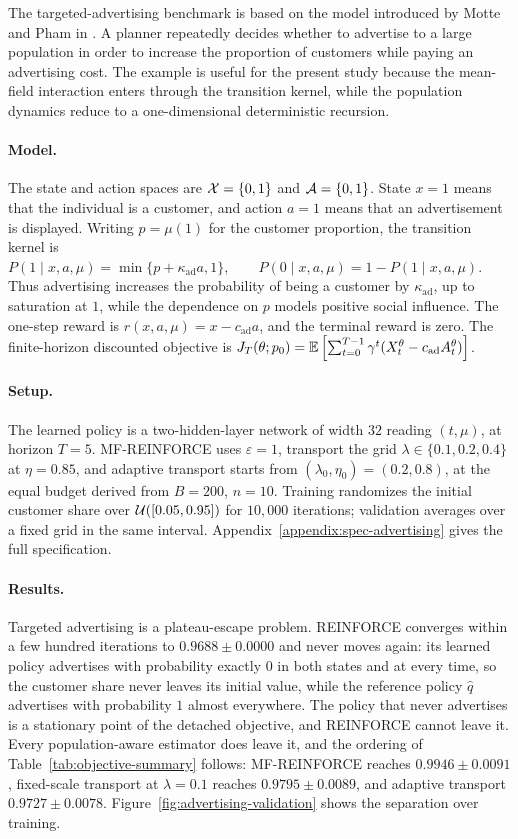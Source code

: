 The targeted-advertising benchmark is based on the model introduced by Motte and Pham in \cite{motte_pham_mfmdp}. A planner repeatedly decides whether to advertise to a large population in order to increase the proportion of customers while paying an advertising cost. The example is useful for the present study because the mean-field interaction enters through the transition kernel, while the population dynamics reduce to a one-dimensional deterministic recursion.

\paragraph{Model.}
The state and action spaces are ${\cal X}=\{0,1\}$ and ${\cal A}=\{0,1\}$. State $x=1$ means that the individual is a customer, and action $a=1$ means that an advertisement is displayed. Writing $p=\mu(1)$ for the customer proportion, the transition kernel is $P(1\mid x,a,\mu) = \min\{p+\kappa_{\mathrm{ad}}a,1\}, \qquad P(0\mid x,a,\mu) = 1-P(1\mid x,a,\mu)$.
Thus advertising increases the probability of being a customer by $\kappa_{\mathrm{ad}}$, up to saturation at $1$, while the dependence on $p$ models positive social influence. The one-step reward is $r(x,a,\mu)=x-c_{\mathrm{ad}}a$,
and the terminal reward is zero. The finite-horizon discounted objective is $J_T(\theta;p_0) = \mathbb{E}\left[ \sum_{t=0}^{T-1} \gamma^t(X_t^\theta-c_{\mathrm{ad}}A_t^\theta) \right]$.

\paragraph{Setup.}
The learned policy is a two-hidden-layer network of width $32$ reading $(t,\mu)$, at horizon $T=5$. MF-REINFORCE uses $\varepsilon=1$, transport the grid $\lambda\in\{0.1,0.2,0.4\}$ at $\eta=0.85$, and adaptive transport starts from $(\lambda_0,\eta_0)=(0.2,0.8)$, at the equal budget derived from $B=200$, $n=10$. Training randomizes the initial customer share over ${\cal U}([0.05,0.95])$ for $10{,}000$ iterations; validation averages over a fixed grid in the same interval. Appendix~\ref{appendix:spec-advertising} gives the full specification.

\paragraph{Results.}
Targeted advertising is a plateau-escape problem. REINFORCE converges within a few hundred iterations to $0.9688\pm0.0000$ and never moves again: its learned policy advertises with probability exactly $0$ in both states and at every time, so the customer share never leaves its initial value, while the reference policy $\widehat q$ advertises with probability $1$ almost everywhere. The policy that never advertises is a stationary point of the detached objective, and REINFORCE cannot leave it. Every population-aware estimator does leave it, and the ordering of Table~\ref{tab:objective-summary} follows: MF-REINFORCE reaches $0.9946\pm0.0091$, fixed-scale transport at $\lambda=0.1$ reaches $0.9795\pm0.0089$, and adaptive transport $0.9727\pm0.0078$. Figure~\ref{fig:advertising-validation} shows the separation over training.

